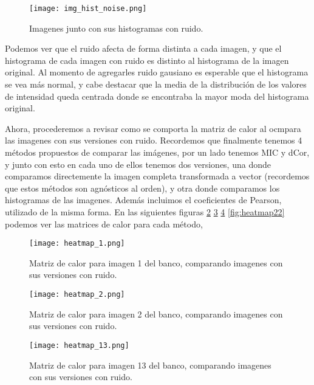 \begin{figure}[H]
    \centering
    \texttt{[image: img\_hist\_noise.png]}
    \caption{Imagenes junto con sus histogramas con ruido.}
    \label{fig:img_hist_ruido}
\end{figure}

Podemos ver que el ruido afecta de forma distinta a cada imagen, y que el histograma de cada imagen con ruido es distinto al histograma de la imagen original. Al momento de agregarles ruido gausiano es esperable que el histograma se vea más normal, y cabe destacar que la media de la distribución de los valores de intensidad queda centrada donde se encontraba la mayor moda del histograma original. 

Ahora, procederemos a revisar como se comporta la matriz de calor al ocmpara las imagenes con sus versiones con ruido. Recordemos que finalmente tenemos 4 m\'etodos propuestos de comparar las im\'agenes, por un lado tenemos MIC y dCor, y junto con esto en cada uno de ellos tenemos dos versiones, una donde comparamos directemente la imagen completa transformada a vector (recordemos que estos m\'etodos son agn\'osticos al orden), y otra donde comparamos los histogramas de las imagenes. Adem\'as incluimos el coeficientes de Pearson, utilizado de la misma forma. En las siguientes figuras \ref{fig:heatmap1} \ref{fig:heatmap2} \ref{fig:heatmap13} \ref{fig:heatmap22} podemos ver las matrices de calor para cada m\'etodo,  

\begin{figure}[H]
    \centering
    \texttt{[image: heatmap\_1.png]}
    \caption{Matriz de calor para imagen 1 del banco, comparando imagenes con sus versiones con ruido. }
    \label{fig:heatmap1}
\end{figure}

\begin{figure}[H]
    \centering
    \texttt{[image: heatmap\_2.png]}
    \caption{Matriz de calor para imagen 2 del banco, comparando imagenes con sus versiones con ruido.}
    \label{fig:heatmap2}
\end{figure}

\begin{figure}[H]
    \centering
    \texttt{[image: heatmap\_13.png]}
    \caption{Matriz de calor para imagen 13 del banco, comparando imagenes con sus versiones con ruido.}
    \label{fig:heatmap13}
\end{figure}

